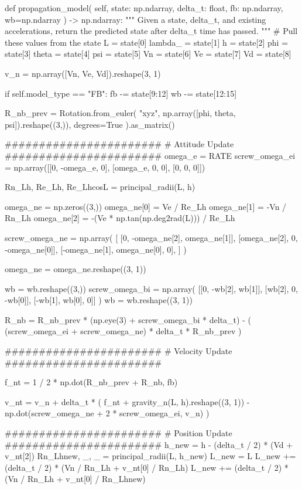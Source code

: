 \documentclass{article}
\begin{document}
\begin{python}
    def propagation_model(
    self, state: np.ndarray, delta_t: float, fb: np.ndarray, wb=np.ndarray
    ) -> np.ndarray:
    """
    Given a state, delta_t, and existing accelerations, return
    the predicted state after delta_t time has passed.
    """
    # Pull these values from the state
    L = state[0]
    lambda_ = state[1]
    h = state[2]
    phi = state[3]
    theta = state[4]
    psi = state[5]
    Vn = state[6]
    Ve = state[7]
    Vd = state[8]

    v_n = np.array([Vn, Ve, Vd]).reshape(3, 1)

    if self.model_type == "FB":
    fb -= state[9:12]
    wb -= state[12:15]

    R_nb_prev = Rotation.from_euler(
    "xyz", np.array([phi, theta, psi]).reshape((3,)), degrees=True
    ).as_matrix()

    #######################
    # Attitude Update
    #######################
    omega_e = RATE
    screw_omega_ei = np.array([[0, -omega_e, 0], [omega_e, 0, 0], [0, 0, 0]])

    Rn_Lh, Re_Lh, Re_LhcosL = principal_radii(L, h)

    omega_ne = np.zeros((3,))
    omega_ne[0] = Ve / Re_Lh
    omega_ne[1] = -Vn / Rn_Lh
    omega_ne[2] = -(Ve * np.tan(np.deg2rad(L))) / Re_Lh

    screw_omega_ne = np.array(
    [
    [0, -omega_ne[2], omega_ne[1]],
    [omega_ne[2], 0, -omega_ne[0]],
    [-omega_ne[1], omega_ne[0], 0],
    ]
    )

    omega_ne = omega_ne.reshape((3, 1))

    wb = wb.reshape((3,))
    screw_omega_bi = np.array(
    [[0, -wb[2], wb[1]], [wb[2], 0, -wb[0]], [-wb[1], wb[0], 0]]
    )
    wb = wb.reshape((3, 1))

    R_nb = R_nb_prev * (np.eye(3) + screw_omega_bi * delta_t) - (
    (screw_omega_ei + screw_omega_ne) * delta_t * R_nb_prev
    )

    #######################
    # Velocity Update
    #######################

    f_nt = 1 / 2 * np.dot(R_nb_prev + R_nb, fb)

    v_nt = v_n + delta_t * (
    f_nt
    + gravity_n(L, h).reshape((3, 1))
    - np.dot(screw_omega_ne + 2 * screw_omega_ei, v_n)
    )

    #######################
    # Position Update
    #######################
    h_new = h - (delta_t / 2) * (Vd + v_nt[2])
    Rn_Lhnew, _, _ = principal_radii(L, h_new)
    L_new = L
    L_new += (delta_t / 2) * (Vn / Rn_Lh + v_nt[0] / Rn_Lh)
    L_new += (delta_t / 2) * (Vn / Rn_Lh + v_nt[0] / Rn_Lhnew)


\end{python}
\end{document}
